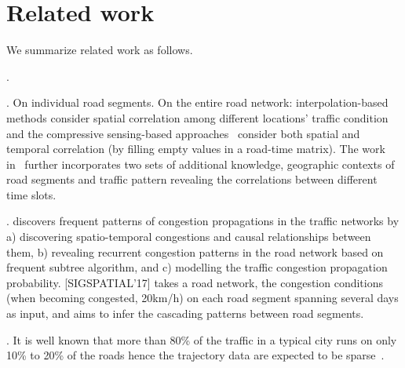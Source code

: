 \section{Related work}
\label{sec-related}
We summarize related work as follows.

.

. On individual road segments. On the entire road network: interpolation-based methods consider spatial correlation among different locations' traffic condition and the compressive sensing-based approaches~\cite{Zhu2013TMC} consider both spatial and temporal correlation (by filling empty values in a road-time matrix). The work in~\cite{Shang2014KDD} further incorporates two sets of additional knowledge, \ie geographic contexts of road segments and traffic pattern revealing the correlations between different time slots.

. \cite{Nguyen2017TBD} discovers frequent patterns of congestion propagations in the traffic networks by a) discovering spatio-temporal congestions and causal relationships between them, b) revealing recurrent congestion patterns in the road network based on frequent subtree algorithm, and c) modelling the traffic congestion propagation probability. [SIGSPATIAL'17] takes a road network, the congestion conditions (when becoming congested, 20km/h) on each road segment spanning several days as input, and aims to infer the cascading patterns between road segments.

. It is well known that more than 80\% of the traffic in a typical city runs on only 10\% to 20\% of the roads hence the trajectory data are expected to be sparse~\cite{WuMSZZCWKDD16}.
